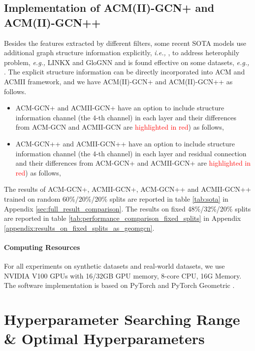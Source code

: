 \documentclass{article}
\newcommand\ie{\textit{i.e.,}}
\newcommand\eg{\textit{e.g.,}}
\newcommand{\red}{\textcolor{red}}
\newcommand{\0}{{\boldsymbol{0}}}
\newcommand{\6}{{\partial}}
\newcommand{\8}{{\infty}}
\newcommand{\4}{{\nabla}}
\begin{document}
\subsection{Implementation of ACM(II)-GCN+ and ACM(II)-GCN++}
Besides the features extracted by different filters, some recent SOTA models use additional graph structure information explicitly, \ie{}  , to address heterophily problem, \eg{} LINKX \cite{lim2021large} and GloGNN \cite{li2022finding} and is found effective on some datasets, \eg{} . The explicit structure information can be directly incorporated into ACM and ACMII framework, and we have ACM(II)-GCN+ and ACM(II)-GCN++ as follows.
\begin{itemize}
\item ACM-GCN+ and ACMII-GCN+ have an option to include structure information channel (the 4-th channel) in each layer and their differences from ACM-GCN and ACMII-GCN are \red{highlighted in red}) as follows,
    
    

\item  ACM-GCN++ and ACMII-GCN++ have an option to include structure information channel (the 4-th channel) in each layer and residual connection and their differences from ACM-GCN+ and ACMII-GCN+ are \red{highlighted in red}) as follows,



\end{itemize}




The results of ACM-GCN+, ACMII-GCN+, ACM-GCN++ and ACMII-GCN++ trained on random 60\%/20\%/20\% splits are reported in table \ref{tab:sota} in Appendix \ref{sec:full_result_comparison}. The results on fixed 48\%/32\%/20\% splits are reported in table \ref{tab:performance_comparison_fixed_splits} in Appendix \ref{appendix:results_on_fixed_splits_as_geomgcn}.



\paragraph{Computing Resources}
For all experiments on synthetic datasets and real-world datasets, we use NVIDIA V100 GPUs with 16/32GB GPU memory, 8-core CPU, 16G Memory. The
software implementation is based on PyTorch and PyTorch Geometric \cite{fey2019fast}.

\section{Hyperparameter Searching Range \& Optimal Hyperparameters}
\label{appendix:hyperparameter}
\end{document}
